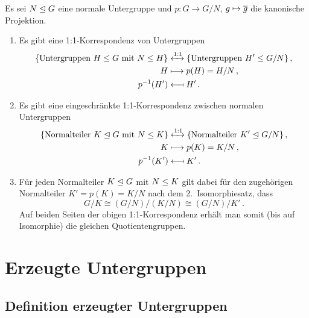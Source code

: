 \begin{proposition}
  Es sei $N \mathrel{\trianglelefteq} G$ eine normale Untergruppe und $p \colon G \to G/N$, $g \mapsto \overline{g}$ die kanonische Projektion.
  \begin{enumerate}
    \item
      Es gibt eine 1:1-Korrespondenz von Untergruppen
      \begin{align*}
        \{ \text{Untergruppen $H \mathrel{\leq} G$ mit $N \mathrel{\leq} H$} \}
        &\xleftrightarrow{1:1}
        \{ \text{Untergruppen $H' \mathrel{\leq} G/N$} \} \,,
        \\
        H
        &\longmapsto
        p(H)
        =
        H/N \,,
        \\
        p^{-1}(H')
        &\longmapsfrom
        H' \,.
      \end{align*}
    \item
      Es gibt eine eingeschränkte 1:1-Korrespondenz zwischen normalen Untergruppen
      \begin{align*}
        \{ \text{Normalteiler $K \mathrel{\trianglelefteq} G$ mit $N \mathrel{\leq} K$} \}
        &\xleftrightarrow{1:1}
        \{ \text{Normalteiler $K' \mathrel{\trianglelefteq} G/N$} \} \,,
        \\
        K
        &\longmapsto
        p(K)
        =
        K/N \,,
        \\
        p^{-1}(K')
        &\longmapsfrom
        K' \,.
      \end{align*}
    \item
      Für jeden Normalteiler $K \mathrel{\trianglelefteq} G$ mit $N \mathrel{\leq} K$ gilt dabei für den zugehörigen Normalteiler $K' = p(K) = K/N$ nach dem 2.\ Isomorphiesatz, dass
      \[
              G/K
        \cong (G/N)/(K/N)
        \cong (G/N)/K' \,.
      \]
      Auf beiden Seiten der obigen 1:1-Korrespondenz erhält man somit \textup(bis auf Isomorphie\textup) die gleichen Quotientengruppen.
  \end{enumerate}
\end{proposition}





\section{Erzeugte Untergruppen}



\subsection{Definition erzeugter Untergruppen}

